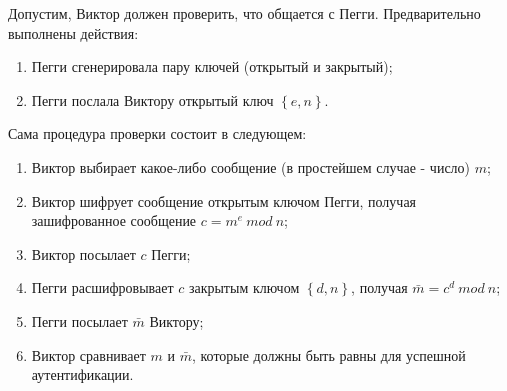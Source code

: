 Допустим, Виктор должен проверить, что общается с Пегги. Предварительно выполнены действия:

\begin{enumerate}
\item Пегги сгенерировала пару ключей (открытый и закрытый);
\item Пегги послала Виктору открытый ключ $\left\{e,n\right\}$.
\end{enumerate}


Сама процедура проверки состоит в следующем:

\begin{enumerate}
\item Виктор выбирает какое-либо сообщение (в простейшем случае \-- число) $m$;
\item Виктор шифрует сообщение открытым ключом Пегги, получая зашифрованное сообщение
        $c = m^e \ mod \ n$;
\item Виктор посылает $c$ Пегги;
\item Пегги расшифровывает $c$ закрытым ключом $\left\{d,n\right\}$, получая $\bar{m} = c^d \ mod \ n$;
\item Пегги посылает $\bar{m}$ Виктору;
\item Виктор сравнивает $m$ и $\bar{m}$, которые должны быть равны для успешной аутентификации.

\end{enumerate}